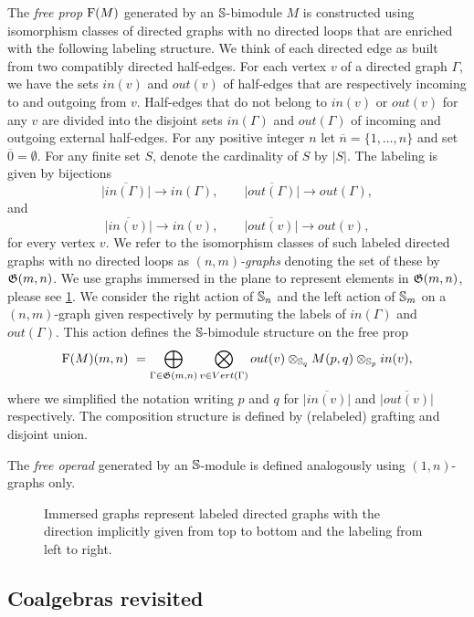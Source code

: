The \textit{free prop} $\free(M)$ generated by an $\S$-bimodule $M$ is constructed using isomorphism classes of directed graphs with no directed loops that are enriched with the following labeling structure.
We think of each directed edge as built from two compatibly directed half-edges.
For each vertex $v$ of a directed graph $\Gamma$, we have the sets $in(v)$ and $out(v)$ of half-edges that are respectively incoming to and outgoing from $v$.
Half-edges that do not belong to $in(v)$ or $out(v)$ for any $v$ are divided into the disjoint sets $in(\Gamma)$ and $out(\Gamma)$ of incoming and outgoing external half-edges.
For any positive integer $n$ let $\overline{n} = \{1, \dots, n\}$ and set $\overline{0} = \emptyset$.
For any finite set $S$, denote the cardinality of $S$ by $|S|$.
The labeling is given by bijections
\[
\overline{|in(\Gamma)|}\to in(\Gamma), \qquad
\overline{|out(\Gamma)|}\to out(\Gamma),
\]
and
\[
\overline{|in(v)|}\to in(v), \qquad
\overline{|out(v)|}\to out(v),
\]
for every vertex $v$.
We refer to the isomorphism classes of such labeled directed graphs with no directed loops as $(n,m)$\textit{-graphs} denoting the set of these by $\graphs(m,n)$.
We use graphs immersed in the plane to represent elements in $\graphs(m,n)$, please see \cref{f:immersion}.
We consider the right action of $\S_n$ and the left action of $\S_m$ on a $(n,m)$-graph given respectively by permuting the labels of $in(\Gamma)$ and $out(\Gamma)$.
This action defines the $\S$-bimodule structure on the free prop
\begin{equation} \label{e:free prop}
	\free(M)(m,n) \ = \bigoplus_{\Gamma \in \graphs(m,n)} \bigotimes_{v \in Vert(\Gamma)} out(v) \otimes_{\S_q} M(p, q) \otimes_{\S_p} in(v),
\end{equation}
where we simplified the notation writing $p$ and $q$ for $\overline{|in(v)|}$ and $\overline{|out(v)|}$ respectively.
The composition structure is defined by (relabeled) grafting and disjoint union.

The \textit{free operad} generated by an $\S$-module is defined analogously using $(1,n)$-graphs only.

\begin{figure}
	
	\caption{Immersed graphs represent labeled directed graphs with the direction implicitly given from top to bottom and the labeling from left to right.}
	\label{f:immersion}
\end{figure}

\subsection{Coalgebras revisited}

